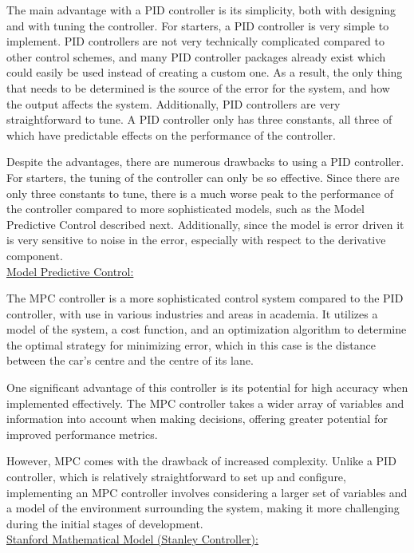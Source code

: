 \documentclass[titlepage,draft]{article}
\begin{document}
{The main advantage with a PID controller is its simplicity, both with designing and with tuning the controller. For starters, a PID controller is very simple to implement. PID controllers are not very technically complicated compared to other control schemes, and many PID controller packages already exist which could easily be used instead of creating a custom one. As a result, the only thing that needs to be determined is the source of the error for the system, and how the output affects the system. Additionally, PID controllers are very straightforward to tune. A PID controller only has three constants, all three of which have predictable effects on the performance of the controller.

Despite the advantages, there are numerous drawbacks to using a PID controller. For starters, the tuning of the controller can only be so effective. Since there are only three constants to tune, there is a much worse peak to the performance of the controller compared to more sophisticated models, such as the Model Predictive Control described next. Additionally, since the model is error driven it is very sensitive to noise in the error, especially with respect to the derivative component.
\\

\underline{Model Predictive Control:}

The MPC controller is a more sophisticated control system compared to the PID controller, with use in various industries and areas in academia.\cite{GARCIA1989335} It utilizes a model of the system, a cost function, and an optimization algorithm to determine the optimal strategy for minimizing error, which in this case is the distance between the car's centre and the centre of its lane.

One significant advantage of this controller is its potential for high accuracy when implemented effectively. The MPC controller takes a wider array of variables and information into account when making decisions, offering greater potential for improved performance metrics.

However, MPC comes with the drawback of increased complexity. Unlike a PID controller, which is relatively straightforward to set up and configure, implementing an MPC controller involves considering a larger set of variables and a model of the environment surrounding the system, making it more challenging during the initial stages of development.
\\

\underline{Stanford Mathematical Model (Stanley Controller):}

}
\end{document}
